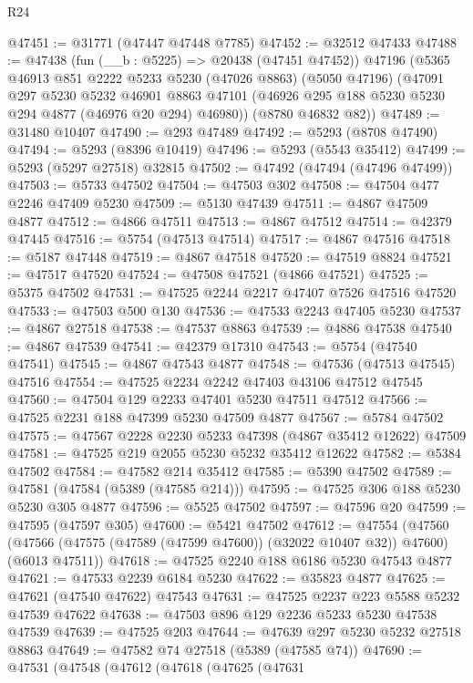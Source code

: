 \begin{lexlean}{R24}
\begin{coremodule}
@47451 := @31771 (@47447 @47448 @7785)
@47452 := @32512 @47433
@47488 := @47438
    (fun (__b : @5225) => @20438 (@47451 @47452))
    @47196
    (@5365
      @46913
      @851
      @2222
      @5233
      @5230
      (@47026 @8863)
      (@5050 @47196)
      (@47091
        @297
        @5230
        @5232
        @46901
        @8863
        @47101
        (@46926 @295 @188 @5230 @5230 @294 @4877 (@46976 @20 @294) @46980))
      (@8780 @46832 @82))
@47489 := @31480 @10407
@47490 := @293 @47489
@47492 := @5293 (@8708 @47490)
@47494 := @5293 (@8396 @10419)
@47496 := @5293 (@5543 @35412)
@47499 := @5293 (@5297 @27518) @32815
@47502 := @47492 (@47494 (@47496 @47499))
@47503 := @5733 @47502
@47504 := @47503 @302
@47508 := @47504 @477 @2246 @47409 @5230
@47509 := @5130 @47439
@47511 := @4867 @47509 @4877
@47512 := @4866 @47511
@47513 := @4867 @47512
@47514 := @42379 @47445
@47516 := @5754 (@47513 @47514)
@47517 := @4867 @47516
@47518 := @5187 @47448
@47519 := @4867 @47518
@47520 := @47519 @8824
@47521 := @47517 @47520
@47524 := @47508 @47521 (@4866 @47521)
@47525 := @5375 @47502
@47531 := @47525 @2244 @2217 @47407 @7526 @47516 @47520
@47533 := @47503 @500 @130
@47536 := @47533 @2243 @47405 @5230
@47537 := @4867 @27518
@47538 := @47537 @8863
@47539 := @4886 @47538
@47540 := @4867 @47539
@47541 := @42379 @17310
@47543 := @5754 (@47540 @47541)
@47545 := @4867 @47543 @4877
@47548 := @47536 (@47513 @47545) @47516
@47554 := @47525 @2234 @2242 @47403 @43106 @47512 @47545
@47560 := @47504 @129 @2233 @47401 @5230 @47511 @47512
@47566 := @47525 @2231 @188 @47399 @5230 @47509 @4877
@47567 := @5784 @47502
@47575 := @47567 @2228 @2230 @5233 @47398 (@4867 @35412 @12622) @47509
@47581 := @47525 @219 @2055 @5230 @5232 @35412 @12622
@47582 := @5384 @47502
@47584 := @47582 @214 @35412
@47585 := @5390 @47502
@47589 := @47581 (@47584 (@5389 (@47585 @214)))
@47595 := @47525 @306 @188 @5230 @5230 @305 @4877
@47596 := @5525 @47502
@47597 := @47596 @20
@47599 := @47595 (@47597 @305)
@47600 := @5421 @47502
@47612 := @47554
    (@47560 (@47566 (@47575 (@47589 (@47599 @47600)) (@32022 @10407 @32)) @47600) (@6013 @47511))
@47618 := @47525 @2240 @188 @6186 @5230 @47543 @4877
@47621 := @47533 @2239 @6184 @5230
@47622 := @35823 @4877
@47625 := @47621 (@47540 @47622) @47543
@47631 := @47525 @2237 @223 @5588 @5232 @47539 @47622
@47638 := @47503 @896 @129 @2236 @5233 @5230 @47538 @47539
@47639 := @47525 @203
@47644 := @47639 @297 @5230 @5232 @27518 @8863
@47649 := @47582 @74 @27518 (@5389 (@47585 @74))
@47690 := @47531
    (@47548
      (@47612
        (@47618
          (@47625
            (@47631

\end{coremodule}
\end{lexlean}
